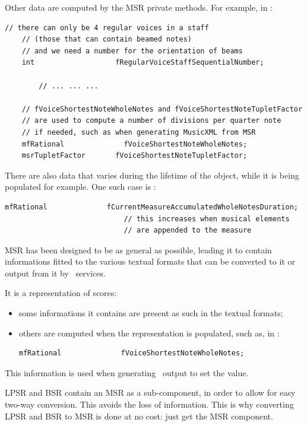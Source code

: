 Other data are computed by the MSR private methods. For example, in :
\begin{lstlisting}[language=CPlusPlus]
    // there can only be 4 regular voices in a staff
    // (those that can contain beamed notes)
    // and we need a number for the orientation of beams
    int                   fRegularVoiceStaffSequentialNumber;

		// ... ... ...

    // fVoiceShortestNoteWholeNotes and fVoiceShortestNoteTupletFactor
    // are used to compute a number of divisions per quarter note
    // if needed, such as when generating MusicXML from MSR
    mfRational              fVoiceShortestNoteWholeNotes;
    msrTupletFactor       fVoiceShortestNoteTupletFactor;
\end{lstlisting}

There are also data that varies during the lifetime of the object, while it is being populated for example.
One such case is :
\begin{lstlisting}[language=CPlusPlus]
    mfRational              fCurrentMeasureAccumulatedWholeNotesDuration;
                            // this increases when musical elements
                            // are appended to the measure
\end{lstlisting}

MSR has been designed to be as general as possible, leading it to contain informations fitted to the various textual formats that can be converted to it or output from it by \mf\ services.

It is a  representation of scores:
\begin{itemize}
\item some informations it contains are present as such in the textual formats;
\item others are computed when the representation is populated, such as, in :
\begin{lstlisting}[language=CPlusPlus]
    mfRational              fVoiceShortestNoteWholeNotes;
\end{lstlisting}
\end{itemize}
This information is used when generating \mxml\ output to set the  value.

LPSR and BSR contain an MSR as a sub-component, in order to allow for easy two-way conversion. This avoids the loss of information. This is why converting LPSR and BSR to MSR is done at no cost: just get the MSR component.

